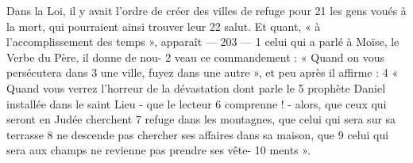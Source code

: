 Dans la Loi, il y avait l'ordre de créer des villes de refuge pour	 
21	 	les gens voués à la mort, qui pourraient ainsi trouver leur	 
22	 	salut. Et quant, « à l'accomplissement des temps », apparaît	 
 	--- 203 ---	 
1	 	celui qui a parlé à Moïse, le Verbe du Père, il donne de nou-	 
2	 	veau ce commandement : « Quand on vous persécutera dans	 
3	 	une ville, fuyez dans une autre », et peu après il affirme :	 
4	 	« Quand vous verrez l'horreur de la dévastation dont parle le	 
5	 	prophète Daniel installée dans le saint Lieu - que le lecteur	 
6	 	comprenne ! - alors, que ceux qui seront en Judée cherchent	 
7	 	refuge dans les montagnes, que celui qui sera sur sa terrasse	 
8	 	ne descende pas chercher ses affaires dans sa maison, que	 
9	 	celui qui sera aux champs ne revienne pas prendre ses vête-	 
10	 	ments ».